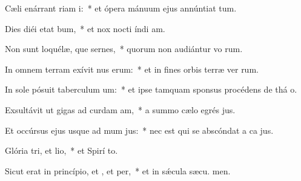 \item Cæli enárrant riam i:~* et ópera mánuum ejus annúntiat tum.
\item Dies diéi etat bum,~* et nox nocti índi am.
\item Non sunt loquélæ, que sernes,~* quorum non audiántur vo rum.
\item In omnem terram exívit nus erum:~* et in fines orbis terræ ver rum.
\item In sole pósuit taberculum um:~* et ipse tamquam sponsus procédens de thá o.
\item Exsultávit ut gigas ad curdam am,~* a summo cælo egrés jus.
\item Et occúrsus ejus usque ad mum jus:~* nec est qui se abscóndat a ca jus.
\item Glória tri, et lio,~* et Spirí to.
\item Sicut erat in princípio, et , et per,~* et in sǽcula sæcu. men.
